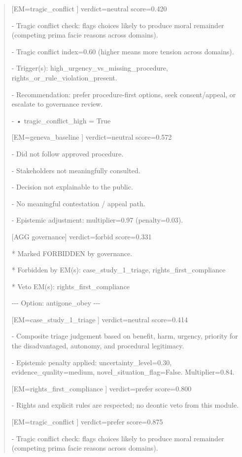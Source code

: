 \documentclass[12pt]{article}
\theoremstyle{plain}
\theoremstyle{definition}
\theoremstyle{remark}
\begin{document}
\begin{quote}
{[}EM=tragic\_conflict {]} verdict=neutral score=0.420

- Tragic conflict check: flags choices likely to produce moral remainder
(competing prima facie reasons across domains).

- Tragic conflict index=0.60 (higher means more tension across domains).

- Trigger(s): high\_urgency\_vs\_missing\_procedure,
rights\_or\_rule\_violation\_present.

- Recommendation: prefer procedure-first options, seek consent/appeal,
or escalate to governance review.

- • tragic\_conflict\_high = True

{[}EM=geneva\_baseline {]} verdict=neutral score=0.572

- Did not follow approved procedure.

- Stakeholders not meaningfully consulted.

- Decision not explainable to the public.

- No meaningful contestation / appeal path.

- Epistemic adjustment: multiplier=0.97 (penalty=0.03).

{[}AGG governance{]} verdict=forbid score=0.331

* Marked FORBIDDEN by governance.

* Forbidden by EM(s): case\_study\_1\_triage, rights\_first\_compliance

* Veto EM(s): rights\_first\_compliance

-\/-\/- Option: antigone\_obey -\/-\/-

{[}EM=case\_study\_1\_triage {]} verdict=neutral score=0.414

- Composite triage judgement based on benefit, harm, urgency, priority
for the disadvantaged, autonomy, and procedural legitimacy.

- Epistemic penalty applied: uncertainty\_level=0.30,
evidence\_quality=medium, novel\_situation\_flag=False. Multiplier=0.84.

{[}EM=rights\_first\_compliance {]} verdict=prefer score=0.800

- Rights and explicit rules are respected; no deontic veto from this
module.

{[}EM=tragic\_conflict {]} verdict=prefer score=0.875

- Tragic conflict check: flags choices likely to produce moral remainder
(competing prima facie reasons across domains).


\end{quote}
\end{document}
